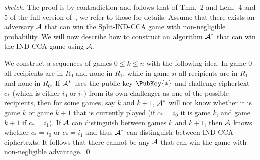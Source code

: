 \begin{proof}[sketch]
  The proof is by contradiction and follows that of Thm.~2 and Lem.~4 and 5 of 
  the full version of~\cite{ANOBE}, we refer to those for details.
  Assume that there exists an adversary \(\A\) that can win the Split-IND-CCA 
  game with non-negligible probability.
  We will now describe how to construct an algorithm \(\A*\) that can win the 
  IND-CCA game using \(\A\).

  We construct a sequences of games \(0\leq k\leq n\) with the following idea.
  In game \(0\) all recipients are in \(R_0\) and none in \(R_1\), while in 
  game \(n\) all recipients are in \(R_1\) and none in \(R_0\).
  If \(\A*\) uses the public key \(\PubKey{*}\) and challenge ciphertext 
  \(c_*\) (which is either \(i_0\) or \(i_1\)) from its own challenger as one 
  of the possible recipients, then for some games, say \(k\) and \(k+1\), 
  \(\A*\) will not know whether it is game \(k\) or game \(k+1\) that is 
  currently played (if \(c_* = i_0\) it is game \(k\), and game \(k+1\) if 
  \(c_* = i_1\)).
  If \(\A\) can distinguish between games \(k\) and \(k+1\), then \(\A\) knows 
  whether \(c_* = i_0\) or \(c_* = i_1\) and thus \(\A*\) can distinguish 
  between IND-CCA ciphertexts.
%
%
%
%
  It follows that there cannot be any \(\A\) that can win the game with 
  non-negligible advantage.
  \qed{}
\end{proof}

